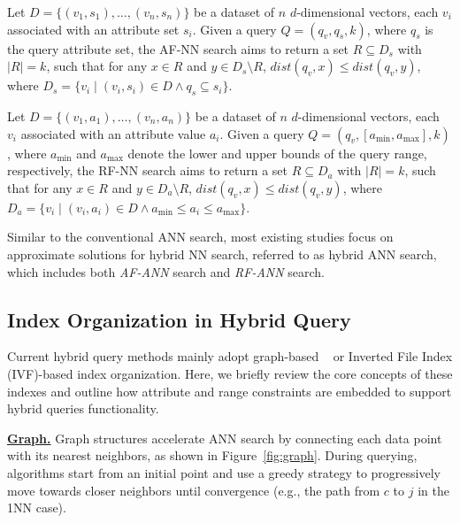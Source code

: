 \documentclass[sigconf, nonacm, pdfa]{acmart}
\begin{document}
{	\begin{definition}[AF-NN Search]
		Let \( D = \{(v_1, s_1), \ldots, (v_n, s_n)\} \) be a dataset of \( n \) \( d \)-dimensional vectors, each  \( v_i \) associated with an attribute set \( s_i \). Given a query \( Q = (q_v, q_s, k) \), where \( q_s \) is the query attribute set, the AF-NN search aims to return a set \( R \subseteq D_s \) with \( |R| = k \), such that for any \( x \in R \) and \( y \in D_s \setminus R \), \( \textit{dist}(q_v, x) \leq \textit{dist}(q_v, y) \), where \( D_s = \{ v_i \mid (v_i, s_i) \in D \land q_s \subseteq s_i \} \).
	\end{definition}
	
	
	\begin{definition}[RF-NN Search]
		
		Let \( D = \{(v_1, a_1), \ldots, (v_n, a_n)\} \) be a dataset of \( n \) \( d \)-dimensional vectors, each  \( v_i \) associated with an attribute value \( a_i \). Given a query \( Q = (q_v, [a_{\min}, a_{\max}], k) \), where \( a_{\min} \) and \( a_{\max} \) denote the lower and upper bounds of the query range, respectively, the RF-NN search aims to return a set \( R \subseteq D_a \) with \( |R| = k \), such that for any \( x \in R \) and \( y \in D_a \setminus R \), \( \textit{dist}(q_v, x) \leq \textit{dist}(q_v, y) \), where \( D_a = \{ v_i \mid (v_i, a_i) \in D \land a_{\min} \leq a_i \leq a_{\max} \} \).
	\end{definition}
	
	
	
	Similar to the conventional ANN search, most existing studies focus on approximate solutions for hybrid NN search, referred to as hybrid ANN search, which includes both \textit{AF-ANN} search and \textit{RF-ANN} search.
	
	
	

	\subsection{Index Organization in Hybrid Query}
	
	Current hybrid query methods mainly adopt graph-based ~\cite{nsw,kgraph,nsg,fanng,ngt} or Inverted File Index (IVF)-based \cite{PQ} index organization. 
	Here, we briefly review the core concepts of these indexes and outline how attribute and range constraints are embedded to support hybrid queries functionality.
	
	\noindent\textbf{\underline{Graph.}}
Graph structures accelerate ANN search by connecting each data point with its nearest neighbors, as shown in Figure~\ref{fig:graph}. During querying, algorithms start from an initial point and use a greedy strategy to progressively move towards closer neighbors until convergence (e.g., the path from $c$ to $j$ in the 1NN case).
	
}
\end{document}
